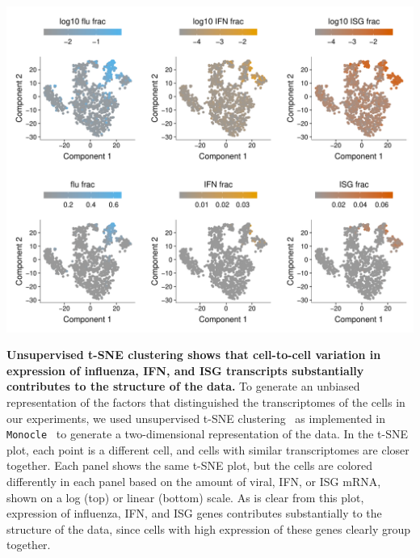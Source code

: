 \documentclass[10pt,letterpaper]{article}
\begin{document}
\begin{suppfig}
\includegraphics[width=\textwidth]{figures/single_cell_figures/p_tsne.pdf}
\caption{
{\bf Unsupervised t-SNE clustering shows that cell-to-cell variation in expression of influenza, IFN, and ISG transcripts substantially contributes to the structure of the data.}
To generate an unbiased representation of the factors that distinguished the transcriptomes of the cells in our experiments, we used unsupervised t-SNE clustering~\cite{maaten2008visualizing} as implemented in \texttt{Monocle}~\cite{qiu2017reversed, trapnell2014dynamics} to generate a two-dimensional representation of the data.
In the t-SNE plot, each point is a different cell, and cells with similar transcriptomes are closer together.
Each panel shows the same t-SNE plot, but the cells are colored differently in each panel based on the amount of viral, IFN, or ISG mRNA, shown on a log (top) or linear (bottom) scale.
As is clear from this plot, expression of influenza, IFN, and ISG genes contributes substantially to the structure of the data, since cells with high expression of these genes clearly group together.
}
\label{suppfig:tSNE}
\end{suppfig}
\end{document}
